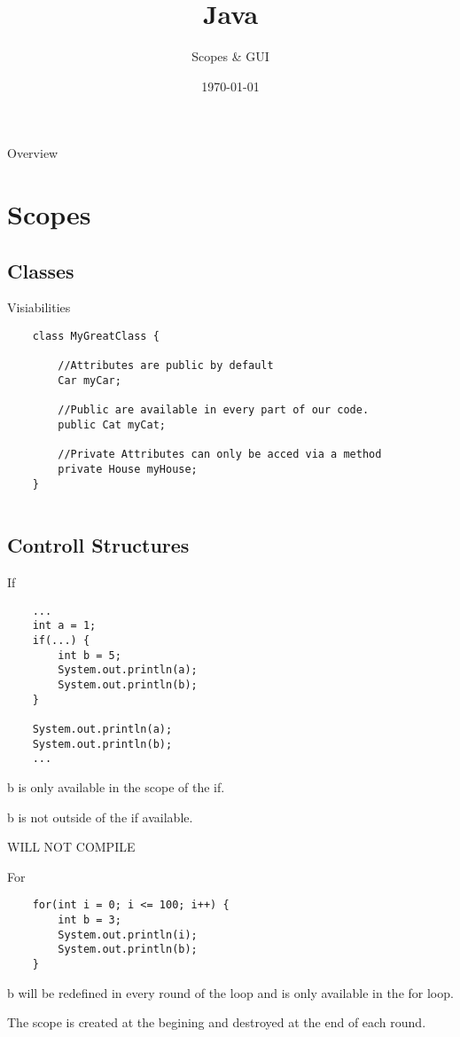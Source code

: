 


\title{Java}
\subtitle{Scopes \& GUI}
\date{\today}



\begin{frame}
\titlepage
\end{frame}

\begin{frame}{Overview}
\tableofcontents
\end{frame}

\section{Scopes}
\subsection{Classes}

\begin{frame}[fragile]{Visiabilities}
	\begin{lstlisting}
	class MyGreatClass {
	
		//Attributes are public by default
		Car myCar; 
	
		//Public are available in every part of our code.
		public Cat myCat;
		
		//Private Attributes can only be acced via a method
		private House myHouse;
	}
		
	\end{lstlisting}
\end{frame}

\subsection{Controll Structures}
\begin{frame}[fragile]{If}
	\begin{lstlisting}
	...
	int a = 1;
	if(...) {
		int b = 5;
		System.out.println(a);
		System.out.println(b);
	}
	
	System.out.println(a);
	System.out.println(b);
	...
	\end{lstlisting}
	
	b is only available in the scope of the if.
	
	b is not outside of the if available.
	
	\color{red} WILL NOT COMPILE
\end{frame}

\begin{frame}[fragile]{For}
	\begin{lstlisting}
	for(int i = 0; i <= 100; i++) {
		int b = 3;
		System.out.println(i);
		System.out.println(b);
	}
	\end{lstlisting}
	
	b will be redefined in every round of the loop and is only available in the for loop.
	
	The scope is created at the begining and destroyed at the end of each round.
\end{frame}

